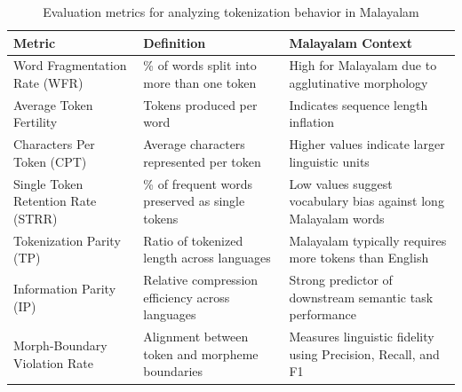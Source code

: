 \documentclass[12pt]{article}
\begin{document}
	\begin{table}[h]
		\centering
		\renewcommand{\arraystretch}{1.2}
		\begin{tabularx}{\textwidth}{l X X}
			\toprule
			\textbf{Metric} & \textbf{Definition} & \textbf{Malayalam Context} \\
			\midrule
			
			Word Fragmentation Rate (WFR) 
			& \% of words split into more than one token 
			& High for Malayalam due to agglutinative morphology \\
			
			Average Token Fertility 
			& Tokens produced per word 
			& Indicates sequence length inflation \\
			
			Characters Per Token (CPT) 
			& Average characters represented per token 
			& Higher values indicate larger linguistic units \\
			
			Single Token Retention Rate (STRR) 
			& \% of frequent words preserved as single tokens 
			& Low values suggest vocabulary bias against long Malayalam words \\
			
			Tokenization Parity (TP) 
			& Ratio of tokenized length across languages 
			& Malayalam typically requires more tokens than English \\
			
			Information Parity (IP) 
			& Relative compression efficiency across languages 
			& Strong predictor of downstream semantic task performance \\
			
			Morph-Boundary Violation Rate 
			& Alignment between token and morpheme boundaries 
			& Measures linguistic fidelity using Precision, Recall, and F1 \\
			
			\bottomrule
		\end{tabularx}
		\caption{Evaluation metrics for analyzing tokenization behavior in Malayalam}
	\end{table}
	
\end{document}
